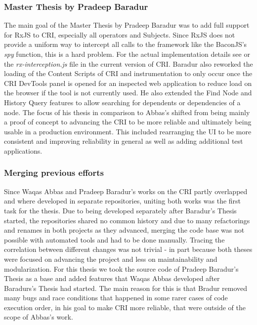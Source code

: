 	\subsubsection{Master Thesis by Pradeep Baradur}
	 \cite{ThesisBaradur} The main goal of the Master Thesis by Pradeep Baradur was to add full support for RxJS to CRI, especially all operators and Subjects. Since RxJS does not provide a uniform way to intercept all calls to the framework like the BaconJS's \emph{spy} function, this is a hard problem. For the actual implementation details see \cite{ThesisBaradur} or the \emph{rx-interception.js} file in the current version of CRI. Baradur also reworked the loading of the Content Scripts of CRI and instrumentation to only occur once the CRI DevTools panel is opened for an inspected web application to reduce load on the browser if the tool is not currently used. He also extended the Find Node and History Query features to allow searching for dependents or dependencies of a node. The focus of his thesis in comparison to Abbas's shifted from being mainly a proof of concept to advancing the CRI to be more reliable and ultimately being usable in a production environment. This included rearranging the UI to be more consistent and improving reliability in general as well as adding additional test applications.
		
	\subsubsection{Merging previous efforts}
	Since Waqas Abbas and Pradeep Baradur's works on the CRI partly overlapped and where developed in separate repositories, uniting both works was the first task for the thesis. Due to being developed separately after Baradur's Thesis started, the repositories shared no common history and due to many refactorings and renames in both projects as they advanced, merging the code base was not possible with automated tools and had to be done manually. Tracing the correlation between different changes was not trivial - in part because both theses were focused on advancing the project and less on maintainability and modularization. For this thesis we took the source code of Pradeep Baradur's Thesis as a base and added features that Waqas Abbas developed after Baradurs's Thesis had started. The main reason for this is that Bradur removed many bugs and race conditions that happened in some rarer cases of code execution order, in his goal to make CRI more reliable, that were outside of the scope of Abbas's work.
		
